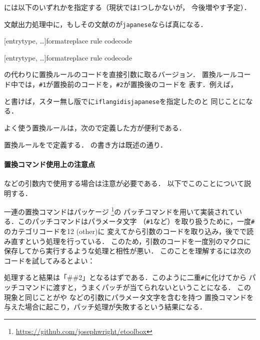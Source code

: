 \documentclass{jlreq}
\begin{document}
には以下のいずれかを指定する（現状では1つしかないが，
  今後増やす予定）．
\begin{typelist}
  文献出力処理中に，もしその文献のが\texttt{japanese}ならば真になる．
\end{typelist}

\begin{ltxsyntax}


  [entrytype, \dots]{format}{replace rule code}{code}

  [entrytype, \dots]{format}{replace rule code}{code}

  の代わりに置換ルールのコードを直接引数に取るバージョン．
  置換ルールコード中では，\verb|#1|が置換前のコードを，\verb|#2|が置換後のコードを
  表す．例えば，
  \begin{ltxexample}
  \end{ltxexample}
  と書けば，スター無し版でに\texttt{iflangidisjapanese}を指定したのと
  同じことになる．

  よく使う置換ルールは，次ので定義した方が便利である．



  置換ルールをで定義する．
  の書き方は既述の通り．
\end{ltxsyntax}

\paragraph{置換コマンド使用上の注意点}
などの引数内で使用する場合は注意が必要である．
以下でこのことについて説明する．

一連の置換コマンドはパッケージ
\footnote{\url{https://github.com/josephwright/etoolbox}}の
パッチコマンドを用いて実装されている．このパッチコマンドはパラメータ文字
（\texttt{\#1}など）を取り扱うために，一度\texttt{\#}のカテゴリコードを12 (other)に
変えてから引数のコードを取り込み，後でで読み直すという処理を行っている．
このため，引数のコードを一度別のマクロに保存してから実行するような処理と相性が悪い．
このことを理解するには次のコードを試してみるとよい：
\begin{ltxexample}
\def\a#1{\detokenize{#1}}
\a{#2}
\end{ltxexample}
処理すると結果は「\#\#2」となるはずである．このように二重\texttt{\#}に化けてから
パッチコマンドに渡すと，うまくパッチが当てられないということになる．
この現象と同じことがや
などの引数にパラメータ文字を含むを持つ
置換コマンドを与えた場合に起こり，パッチ処理が失敗するという結果になる．
\end{document}

